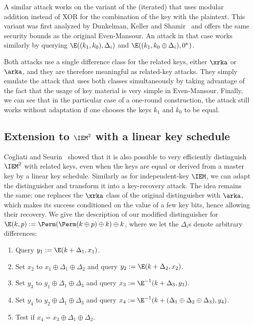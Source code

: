 A similar attack works on the variant of the (iterated) \EM 
that uses modular addition instead of XOR for the combination of the key with the plaintext.
This variant was first analyzed by Dunkelman, Keller and Shamir~\cite{DKS12} and offers the same security bounds as the
original Even-Mansour. An attack in that case works similarly
by querying \eg $\E((k_1, k_0), \Delta_i)$ and
$\E((k_1, k_0 \oplus \Delta_i), 0^\kappa)$.

Both attacks use a single difference class for the related keys, either $\xrka$ or $\arka$,
and they are therefore meaningful as related-key attacks. They simply emulate the attack that uses both
classes simultaneously by taking advantage of the fact that the usage of key material is very simple in
Even-Mansour.
Finally, we can see that in the particular case of a one-round construction, the attack still works without
adaptation if one
chooses the keys $k_1$ and $k_0$ to be equal.

\subsection{Extension to $\IEM^2$ with a linear key schedule}

Cogliati and Seurin~\cite{CS15} showed that it is also possible to very efficiently distinguish
$\IEM^2$ with related keys, even when the keys are equal or derived
from a master key by a linear key schedule. Similarly as for independent-key $\IEM$, we can adapt
the distinguisher and transform it into a key-recovery attack. The idea remains the same: one
replaces the $\xrka$ class of the original distinguisher with $\arka$, which makes its success
conditioned on the value of a few key bits, hence allowing their recovery. We give
the description of our modified distinguisher for $\E(k, p) := \Perm(\Perm(k \oplus p) \oplus k) \oplus k$,
where we let the $\Delta_i$s denote arbitrary differences:

\begin{enumerate}[leftmargin=4em]
	\item Query $y_1 := \E(k + \Delta_1, x_1)$.
	\item Set $x_2$ to $x_1 \oplus \Delta_1 \oplus \Delta_2$ and query $y_2 := \E(k + \Delta_2, x_2)$.
	\item Set $y_3$ to $y_1 \oplus \Delta_1 \oplus \Delta_3$ and query $x_3 := \E^{-1}(k + \Delta_3, y_3)$.
	\item Set $y_4$  to $y_2 \oplus \Delta_1 \oplus \Delta_3$ and query $x_4 := \E^{-1}(k + (\Delta_1 \oplus \Delta_2 \oplus \Delta_3), y_4)$.
	\item Test if $x_4 = x_3 \oplus \Delta_1 \oplus \Delta_2$.
\end{enumerate}

